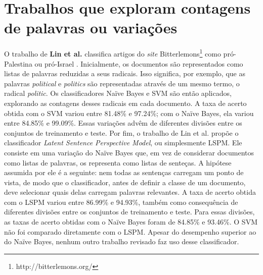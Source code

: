 



\section{Trabalhos que exploram contagens de palavras ou variações}
\label{contagem}

O trabalho de \textbf{Lin et al.} classifica artigos do \emph{site} Bitterlemons\footnote{http://bitterlemons.org/} como pró-Palestina ou pró-Israel \cite{lin-et-al2006}. Inicialmente, os documentos são representados como listas de palavras reduzidas a seus radicais. Isso significa, por exemplo, que as palavras \emph{political} e \emph{politics} são representadas através de um mesmo termo, o radical \emph{politic}. Os classificadores Naïve Bayes e SVM são então aplicados, explorando as contagens desses radicais em cada documento. A taxa de acerto obtida com o SVM variou entre 81.48\% e 97.24\%; com o Naïve Bayes, ela variou entre 84.85\% e 99.09\%. Essas variações advêm de diferentes divisões entre os conjuntos de treinamento e teste. Por fim, o trabalho de Lin et al. propõe o classificador \emph{Latent Sentence Perspective Model}, ou simplesmente LSPM. Ele consiste em uma variação do Naïve Bayes que, em vez de considerar documentos como listas de palavras, os representa como listas de senteças. A hipótese assumida por ele é a seguinte: nem todas as sentenças carregam um ponto de vista, de modo que o classificador, antes de definir a classe de um documento, deve selecionar quais delas carregam palavras relevantes. A taxa de acerto obtida com o LSPM variou entre  86.99\% e 94.93\%, também como consequência de diferentes divisões entre os conjuntos de treinamento e teste. Para essas divisões, as taxas de acerto obtidas com o Naïve Bayes foram de 84.85\% e 93.46\%. O SVM não foi comparado diretamente com o LSPM. Apesar do desempenho superior ao do Naïve Bayes, nenhum outro trabalho revisado faz uso desse classificador. 

